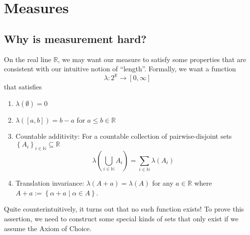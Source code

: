 
\chapter{Measures\label{chap:measures}}

\section{Why is measurement hard?}

On the real line $\mathds{R}$, we may want our measure to satisfy
some properties that are consistent with our intuitive notion of ``length''.
Formally, we want a function
\[
\lambda:2^{\mathds{R}}\longrightarrow\left[0,\infty\right]
\]
that satisfies
\begin{enumerate}
\item $\lambda\left(\emptyset\right)=0$
\item $\lambda\left(\left[a,b\right]\right)=b-a$ for $a\leq b\in\mathds{R}$
\item Countable additivity: For a countable collection of pairwise-disjoint
sets $\left\{ A_{i}\right\} _{i\in\mathbb{N}}\subseteq\mathds{R}$
\begin{equation}
\lambda\left(\bigcup_{i\in\mathbb{N}}A_{i}\right)=\sum_{i\in\mathbb{N}}\lambda\left(A_{i}\right)\label{eq:countableAdditivity}
\end{equation}
\item Translation invariance: $\lambda\left(A+a\right)=\lambda\left(A\right)$
for any $a\in\mathds{R}$ where $A+a:=\left\{ \alpha+a\mid\alpha\in A\right\} $.
\end{enumerate}
Quite counterintuitively, it turns out that no such function exists!
To prove this assertion, we need to construct some special kinds of
sets that only exist if we assume the Axiom of Choice.
